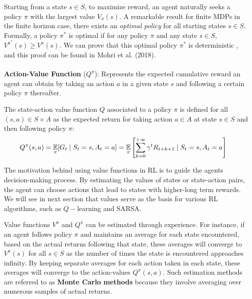 Starting from a state $s \in S$, to maximize reward, an agent naturally seeks a policy $\pi$ with the largest value $V_{\pi}(s)$. A remarkable result for finite MDPs in the finite horizon case, there exists an \textit{optimal policy} for all starting states $s \in S$. Formally, a policy $\pi^*$ is optimal if for any policy $\pi$ and any state $s \in S$, $V^{\pi^*}(s) \geq  V^{\pi}(s)$. 
We can prove that this optimal policy $\pi^*$ is deterministic \cite{mohri2018}, and this proof can be found in Mohri  et al. (2018). 
\\\
\\
\textbf{Action-Value Function} ($Q^{\pi}$): Represents the expected cumulative reward an agent can obtain by taking an action $a$ in a given state $s$ and following a certain policy $\pi$ thereafter. 

\begin{definition}
    The state-action value function $Q$ associated to a policy $\pi$ is defined for all $(s,a) \in S \times A$ as the expected return for taking action $a \in A$ at state $s \in S$ and then following policy $\pi$:
    \begin{align*}
    Q^{\pi}(s,a) &=  \underset{\pi}{\mathbb E} [G_t \mid S_t =s, A_t = a]  = \underset{\pi}{\mathbb E}
    \left [
    \sum_{k =0}^{+ \infty} \gamma^t R_{t+k+1} \mid S_t = s, A_t = a \right ]
    \end{align*}
\end{definition}
The motivation behind using value functions in RL is to guide the agents decision-making process. By estimating the values of states or state-action pairs, the agent can choose actions that lead to states with higher-long term rewards. We will see in next section that values serve as the basis for various RL algorithms, such as $Q-$learning and SARSA.

Value functions $V^{\pi}$ and $Q^{\pi}$ can be estimated through experience. For instance, if an agent follows policy $\pi$ and maintains an average for each state encountered, based on the actual returns following that state, these averages will converge to $V^{\pi}(s)$ for all $s \in S$ as the number of times the state is encountered approaches infinity.
By keeping separate averages for each action taken in each state, these averages will converge to the action-values $Q^{\pi}(s,a)$. Such estimation methods are referred to as \textbf{Monte Carlo methods} because they involve averaging over numerous samples of actual returns.
